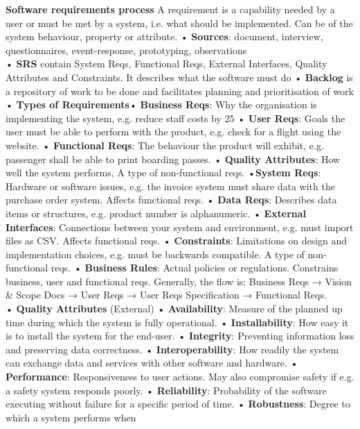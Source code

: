 \documentclass[10pt, landscape]{article}
\begin{document}
\begin{multicols}{4}
\textbf{Software requirements process} A requirement is a capability needed by a user or must be met by a system, i.e. what should be implemented. Can be of the system behaviour, property or attribute. 
• \textbf{Sources}: document, interview, questionnaires, event-response, prototyping, observations \\
• \textbf{SRS} contain
System Reqs, Functional Reqs, External Interfaces, Quality Attributes and Constraints. It describes what the software must do 
• \textbf{Backlog} is a repository of work to be done and facilitates planning and prioritisation of work\\
• \textbf{Types of Requirements}• \textbf{Business Reqs}: Why the organisation is implementing the system, e.g. reduce staff costs by 25%
• \textbf{User Reqs}: Goals the user must be able to perform with the product, e.g. check for a flight using the website.
• \textbf{Functional Reqs}: The behaviour the product will exhibit, e.g. passenger shall be able to print boarding passes.
• \textbf{Quality Attributes}: How well the system performs, A type of non-functional reqs.
•\textbf{System Reqs}: Hardware or software issues, e.g. the invoice system must share data with the purchase order system. Affects functional reqs.
• \textbf{Data Reqs}: Describes data items or structures, e.g. product number is alphanumeric.
• \textbf{External Interfaces}: Connections between your system and environment, e.g. must import files as CSV. Affects functional reqs.
• \textbf{Constraints}: Limitations on design and implementation choices, e.g. must be backwards compatible. A type of non-functional reqs.
• \textbf{Business Rules}: Actual policies or regulations. Constrains business, user and functional reqs.
Generally, the flow is: Business Reqs → Vision \& Scope
Docs → User Reqs → User Reqs Specification → Functional Reqs. \\
• \textbf{Quality Attributes} 
(External)
• \textbf{Availability}: Measure of the planned up time during
which the system is fully operational.
• \textbf{Installability}: How easy it is to install the system for the end-user.
• \textbf{Integrity}: Preventing information loss and preserving data correctness.
• \textbf{Interoperability}: How readily the system can exchange data and services with other software and hardware.
• \textbf{Performance}: Responsiveness to user actions. May also compromise safety if e.g. a safety system responds poorly.
• \textbf{Reliability}: Probability of the software executing without failure for a specific period of time.
• \textbf{Robustness}: Degree to which a system performs when

\end{multicols}
\end{document}
